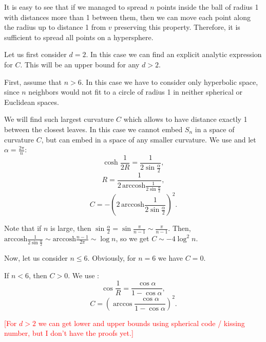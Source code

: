 \documentclass{article} %
\begin{document}
It is easy to see that if we managed to spread $n$ points inside the ball of radius 1 with distances more than 1 between them, then we can move each point along the radius up to distance 1 from $v$ preserving this property. Therefore, it is sufficient to spread all points on a hypersphere. 

Let us first consider $d = 2$. In this case we can find an explicit analytic expression for $C$. This will be an upper bound for any $d>2$.

First, assume that $n > 6$. In this case we have to consider only hyperbolic space, since $n$ neighbors would not fit to a circle of radius 1 in neither spherical or Euclidean spaces.

We will find such largest curvature $C$ which allows to have distance exactly 1 between the closest leaves. In this case we cannot embed $S_n$ in a space of curvature $C$, but can embed in a space of any smaller curvature. 
We use  and let $\alpha = \frac{2\pi}{n}$:
\[
\cosh\frac{1}{2R} = \frac{1}{2\sin \frac{\alpha}{2}},
\]
\[
R = \frac{1}{2\,\textrm{arccosh}\frac{1}{2\sin \frac{\alpha}{2}}},
\]
\[
C = - \left(2\,\textrm{arccosh}\frac{1}{2\sin \frac{\alpha}{2}}\right)^2.
\]

Note that if $n$ is large, then $\sin \frac{\alpha}{2} = \sin\frac{\pi}{n-1} \sim \frac{\pi}{n-1}$. Then,  $\textrm{arccosh}\frac{1}{2\sin \frac{\alpha}{2}} \sim \textrm{arccosh}\frac{n-1}{2\pi} \sim \log n$, so we get $C \sim - 4 \log^2 n$. 

Now, let us consider $n \le 6$. Obviously, for $n = 6$ we have $C = 0$.

If $n < 6$, then $C > 0$. We use :
\[
\cos{\frac{1}{R}} = \frac{\cos \alpha}{1 - \cos \alpha},
\]
\[
C = \left(\arccos \frac{\cos \alpha}{1 - \cos \alpha}\right)^2.
\]

\textcolor{red}{[For $d> 2$ we can get lower and upper bounds using spherical code / kissing number, but I don't have the proofs yet.]} 

\end{document}
